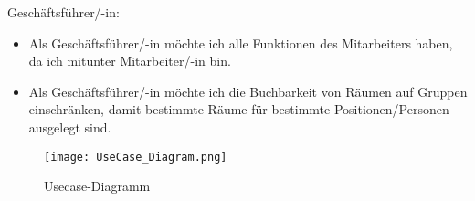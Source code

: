 \noindent Geschäftsführer/-in:

\begin{itemize}
    \item Als Geschäftsführer/-in möchte ich alle Funktionen des Mitarbeiters haben, da ich mitunter Mitarbeiter/-in bin.

    \item Als Geschäftsführer/-in möchte ich die Buchbarkeit von Räumen auf Gruppen einschränken, damit bestimmte Räume für bestimmte Positionen/Personen ausgelegt sind.
\end{itemize}
\begin{sidewaysfigure}
    \centering
    \texttt{[image: UseCase\_Diagram.png]}
    \caption{Usecase-Diagramm}
    \label{fig:Usecase-Diagramm}
\end{sidewaysfigure}